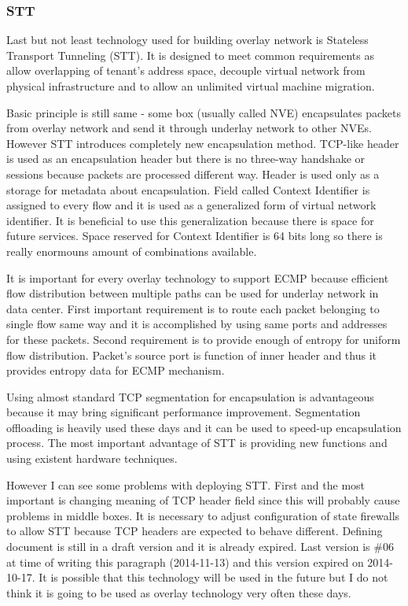 \subsubsection{STT}
Last but not least technology used for building overlay network is Stateless Transport Tunneling (\Ac{STT}). It is designed to meet common requirements as allow overlapping of tenant's address space, decouple virtual network from physical infrastructure and to allow an unlimited virtual machine migration.

Basic principle is still same - some box (usually called \Ac{NVE}) encapsulates packets from overlay network and send it through underlay network to other \Ac{NVE}s. However \Ac{STT} introduces completely new encapsulation method. \Ac{TCP}-like header is used as an encapsulation header but there is no three-way handshake or sessions because packets are processed different way. Header is used only as a storage for metadata about encapsulation. Field called Context Identifier is assigned to every flow and it is used as a generalized form of virtual network identifier. \cite{draft-stt} It is beneficial to use this generalization because there is space for future services. Space reserved for Context Identifier is 64 bits long so there is really enormouns amount of combinations available.

It is important for every overlay technology to support \Ac{ECMP} because efficient flow distribution between multiple paths can be used for underlay network in data center. First important requirement is to route each packet belonging to single flow same way and it is accomplished by using same ports and addresses for these packets. 
Second requirement is to provide enough of entropy for uniform flow distribution. Packet's source port is function of inner header and thus it provides entropy data for \Ac{ECMP} mechanism.

Using almost standard \Ac{TCP} segmentation for encapsulation is advantageous because it may bring significant performance improvement. Segmentation offloading is heavily used these days and it can be used to speed-up encapsulation process. The most important advantage of \Ac{STT} is providing new functions and using existent hardware techniques.

However I can see some problems with deploying \Ac{STT}. First and the most important is changing meaning of \Ac{TCP} header field since this will probably cause problems in middle boxes. It is necessary to adjust configuration of state firewalls to allow \Ac{STT} because \Ac{TCP} headers are expected to behave different. Defining document \cite{draft-stt} is still in a draft version and it is already expired. Last version is \#06 at time of writing this paragraph (2014-11-13) and this version expired on 2014-10-17. It is possible that this technology will be used in the future but I do not think it is going to be used as overlay technology very often these days.

